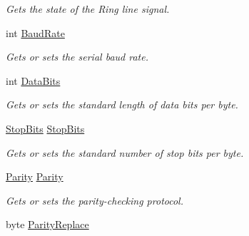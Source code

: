 \begin{DoxyCompactItemize}
\begin{DoxyCompactList}\small\item\em Gets the state of the Ring line signal. \end{DoxyCompactList}\item 
int \mbox{\hyperlink{class_r_j_c_p_1_1_i_o_1_1_ports_1_1_serial_port_stream_acb3fb6aa83ebc6d2c23400df6353efca}{Baud\+Rate}}
\begin{DoxyCompactList}\small\item\em Gets or sets the serial baud rate. \end{DoxyCompactList}\item 
int \mbox{\hyperlink{class_r_j_c_p_1_1_i_o_1_1_ports_1_1_serial_port_stream_a75f62888fa2814a26c19ba59b87d1f96}{Data\+Bits}}
\begin{DoxyCompactList}\small\item\em Gets or sets the standard length of data bits per byte. \end{DoxyCompactList}\item 
\mbox{\hyperlink{namespace_r_j_c_p_1_1_i_o_1_1_ports_a56a13b591d46736acafe20f2976c84fa}{Stop\+Bits}} \mbox{\hyperlink{class_r_j_c_p_1_1_i_o_1_1_ports_1_1_serial_port_stream_a55eadfd081d106442fedabe818a6ca7f}{Stop\+Bits}}
\begin{DoxyCompactList}\small\item\em Gets or sets the standard number of stop bits per byte. \end{DoxyCompactList}\item 
\mbox{\hyperlink{namespace_r_j_c_p_1_1_i_o_1_1_ports_a35c8c760a80dd0392e605dd3ad169954}{Parity}} \mbox{\hyperlink{class_r_j_c_p_1_1_i_o_1_1_ports_1_1_serial_port_stream_a944e2e00a494f4654d615eb1ac0ef52c}{Parity}}
\begin{DoxyCompactList}\small\item\em Gets or sets the parity-\/checking protocol. \end{DoxyCompactList}\item 
byte \mbox{\hyperlink{class_r_j_c_p_1_1_i_o_1_1_ports_1_1_serial_port_stream_a15801195ab593913790ce5eacfd74785}{Parity\+Replace}}

\end{DoxyCompactItemize}
